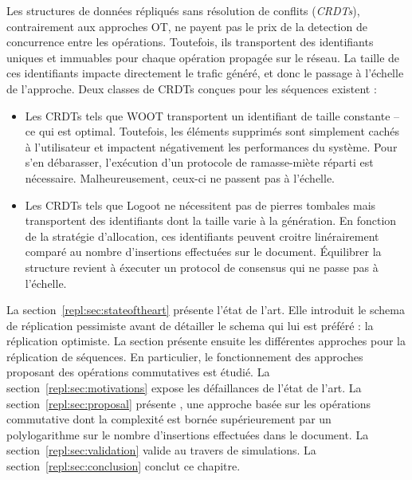 Les structures de données répliqués sans résolution de conflits (\emph{CRDTs}),
contrairement aux approches OT, ne payent pas le prix de la detection de
concurrence entre les opérations. Toutefois, ils transportent des identifiants
uniques et immuables pour chaque opération propagée sur le réseau. La taille de
ces identifiants impacte directement le trafic généré, et donc le passage à
l'échelle de l'approche. Deux classes de CRDTs conçues pour les séquences
existent :

\begin{itemize}
\item Les CRDTs tels que WOOT transportent un identifiant de taille constante --
ce qui est optimal. Toutefois, les éléments supprimés sont simplement cachés à
l'utilisateur et impactent négativement les performances du système. Pour s'en
débarasser, l'exécution d'un protocole de ramasse-miète réparti est
nécessaire. Malheureusement, ceux-ci ne passent pas à l'échelle.

\item Les CRDTs tels que Logoot ne nécessitent pas de pierres tombales mais
transportent des identifiants dont la taille varie à la génération. En fonction
de la stratégie d'allocation, ces identifiants peuvent croitre linérairement
comparé au nombre d'insertions effectuées sur le document. Équilibrer la
structure revient à éxecuter un protocol de consensus qui ne passe pas à
l'échelle.
\end{itemize}


La section~\ref{repl:sec:stateoftheart} présente l'état de l'art. Elle introduit
le schema de réplication pessimiste avant de détailler le schema qui lui est
préféré : la réplication optimiste. La section présente ensuite les différentes
approches pour la réplication de séquences. En particulier, le fonctionnement
des approches proposant des opérations commutatives est étudié. La
section~\ref{repl:sec:motivations} expose les défaillances de l'état de
l'art. La section~\ref{repl:sec:proposal} présente \LSEQ, une approche basée sur
les opérations commutative dont la complexité est bornée supérieurement par un
polylogarithme sur le nombre d'insertions effectuées dans le document. La
section~\ref{repl:sec:validation} valide \LSEQ au travers de simulations. La
section~\ref{repl:sec:conclusion} conclut ce chapitre.


